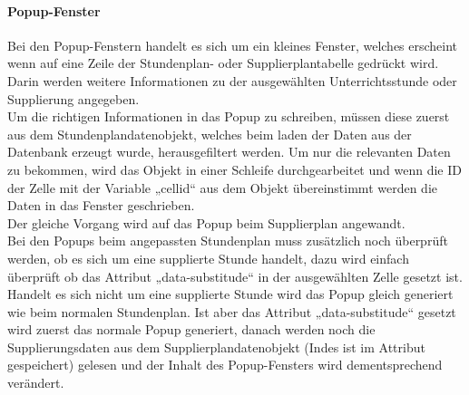 \paragraph{Popup-Fenster\\}
Bei den Popup-Fenstern handelt es sich um ein kleines Fenster, welches erscheint wenn auf eine Zeile der Stundenplan- oder Supplierplantabelle gedrückt wird. Darin werden weitere Informationen zu der ausgewählten Unterrichtsstunde oder Supplierung angegeben.\\
Um die richtigen Informationen in das Popup zu schreiben, müssen diese zuerst aus dem Stundenplandatenobjekt, welches beim laden der Daten aus der Datenbank erzeugt wurde, herausgefiltert werden. Um nur die relevanten Daten zu bekommen, wird das Objekt in einer Schleife durchgearbeitet und wenn die ID der Zelle mit der Variable „cellid“ aus dem Objekt übereinstimmt werden die Daten in das Fenster geschrieben.\\
Der gleiche Vorgang wird auf das Popup beim Supplierplan angewandt.\\
Bei den Popups beim angepassten Stundenplan muss zusätzlich noch überprüft werden, ob es sich um eine supplierte Stunde handelt, dazu wird einfach überprüft ob das Attribut „data-substitude“ in der ausgewählten Zelle gesetzt ist. Handelt es sich nicht um eine supplierte Stunde wird das Popup gleich generiert wie beim normalen Stundenplan. Ist aber das Attribut „data-substitude“ gesetzt wird zuerst das normale Popup generiert, danach werden noch die Supplierungsdaten aus dem Supplierplandatenobjekt (Indes ist im Attribut gespeichert) gelesen und der Inhalt des Popup-Fensters wird dementsprechend verändert.\\


